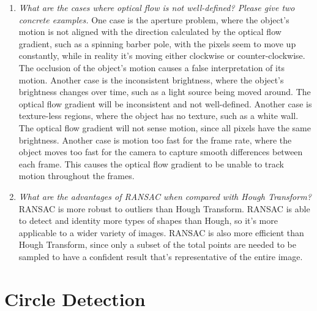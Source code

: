 \documentclass[11pt]{article}
\begin{document}
\begin{enumerate}
        \item \textit{What are the cases where optical flow is not well-defined? Please give two concrete examples.}\newline
        One case is the aperture problem, where the object's motion is not aligned with the direction calculated by the
        optical flow gradient, such as a spinning barber pole, with the pixels seem to move up constantly, while in
        reality it's moving either clockwise or counter-clockwise. The occlusion of the object's motion causes a false
        interpretation of its motion.\newline
        Another case is the inconsistent brightness, where the object's brightness changes over time, such as a
        light source being moved around. The optical flow gradient will be inconsistent and not well-defined.\newline
        Another case is texture-less regions, where the object has no texture, such as a white wall. The optical flow
        gradient will not sense motion, since all pixels have the same brightness.\newline
        Another case is motion too fast for the frame rate, where the object moves too fast for the camera to capture
        smooth differences between each frame. This causes the optical flow gradient to be unable to track motion
        throughout the frames.\newline

        \item \textit{What are the advantages of RANSAC when compared with Hough Transform?}\newline
        RANSAC is more robust to outliers than Hough Transform. RANSAC is able to detect and identity more types of
        shapes than Hough, so it's more applicable to a wider variety of images. RANSAC is also more efficient than
        Hough Transform, since only a subset of the total points are needed to be sampled to have a confident result
        that's representative of the entire image.\newline

    \end{enumerate}


    \section{Circle Detection}
\end{document}
